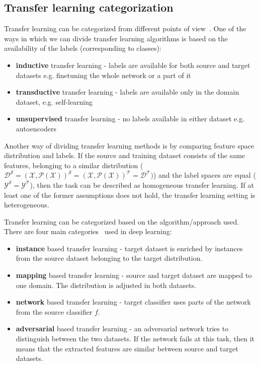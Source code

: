\documentclass[a4paper,11pt,twoside]{report}
\theoremstyle{definition}
\begin{document}
\subsection{Transfer learning categorization}
Transfer learning can be categorized from different points of view~\cite{comp_survey_transfer_leaerning}. One of the ways in which we can divide transfer learning algorithms is based on the availability of the labels (corresponding to classes):
\begin{itemize}
\item \textbf{inductive} transfer learning - labels are available for both source and target datasets e.g. finetuning the whole network or a part of it~\cite{finetuning, first_tl}
\item \textbf{transductive} transfer learning - labels are available only in the domain dataset, e.g. self-learning~\cite{selflearning}
\item \textbf{unsupervised} transfer learning - no labels available in either dataset e.g. autoencoders~\cite{unsup_tl, unsup_tl_2}
\end{itemize}
Another way of dividing transfer learning methods is by comparing feature space distribution and labels. If the source and training dataset consists of the same features, belonging to a similar distribution ($\mathcal{D^S} = \mathcal{(X, P(X))^S} = \mathcal{(X, P(X))^T} = \mathcal{D^T})$) and the label spaces are equal ($\mathcal{Y^S} = \mathcal{Y^T} $), then the task can be described as homogeneous transfer learning. If at least one of the former assumptions does not hold, the transfer learning setting is heterogeneous.

Transfer learning can be categorized based on the algorithm/approach used. There are four main categories~\cite{deep_tranfer_learning} used in deep learning:
\begin{itemize}
	\item \textbf{instance} based transfer learning - target dataset is enriched by instances from the source dataset belonging to the target distribution.
	\item \textbf{mapping} based transfer learning - source and target dataset are mapped to one domain. The distribution is adjusted in both datasets.
	\item \textbf{network} based transfer learning - target classifier uses parts of the network from the source classifier $f$.
	\item \textbf{adversarial} based transfer learning - an adversarial network tries to distinguish between the two datasets. If the network fails at this task, then it means that the extracted features are similar between source and target datasets.
\end{itemize}
\end{document}
